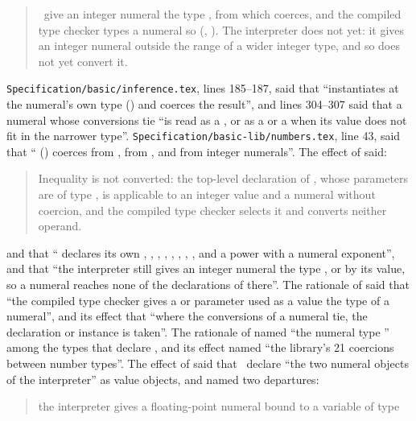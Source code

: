\begin{description}
\begin{quote}
\Library\ give an integer numeral the type , from which
 coerces, and the compiled type checker types a numeral so
(, ).
The interpreter does not yet: it gives an integer numeral outside the range of
 a wider integer type, and so does not yet convert it.
\end{quote}
\nolinkurl{Specification/basic/inference.tex}, lines 185--187, said that
 ``instantiates  at the
numeral's own type () and coerces the result'', and lines
304--307 said that a numeral whose conversions tie ``is read as a
, or as a  or a  when its
value does not fit in the narrower type''.
\nolinkurl{Specification/basic-lib/numbers.tex}, line 43, said that
`` () coerces from , from
, and from integer numerals''.
The effect of  said:
\begin{quote}
Inequality is not converted: the top-level declaration of \EXP{\neq}, whose
parameters are of type , is applicable to an integer value and a
numeral without coercion, and the compiled type checker selects it and converts
neither operand.
\end{quote}
and that `` declares its own , , ,
, , , , ,
 and a power with a numeral exponent'', and that ``the interpreter
still gives an integer numeral the type , 
or  by its value, so a numeral reaches none of the declarations
of  there''.
The rationale of  said that ``the compiled type
checker gives a  or  parameter used as a value the type of a
numeral'', and its effect that ``where the conversions of a numeral tie, the
 declaration or instance is taken''.
The rationale of  named ``the numeral type
'' among the types that declare , and its effect
named ``the library's 21 coercions between number types''.
The effect of  said that \library\ declare ``the
two numeral objects of the interpreter'' as value objects, and named two
departures:
\begin{quote}
the interpreter gives a floating-point numeral bound to a variable of type

\end{quote}
\end{description}
